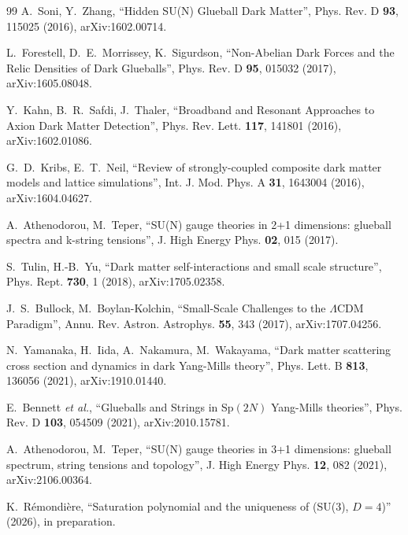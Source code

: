 \documentclass[aps,prd,twocolumn,nofootinbib,superscriptaddress,floatfix]{revtex4-2}
\begin{document}
\begin{thebibliography}{99}
 A.~Soni, Y.~Zhang, ``Hidden SU(N) Glueball Dark Matter'', Phys. Rev. D \textbf{93}, 115025 (2016), arXiv:1602.00714.

 L.~Forestell, D.~E.~Morrissey, K.~Sigurdson, ``Non-Abelian Dark Forces and the Relic Densities of Dark Glueballs'', Phys. Rev. D \textbf{95}, 015032 (2017), arXiv:1605.08048.

 Y.~Kahn, B.~R.~Safdi, J.~Thaler, ``Broadband and Resonant Approaches to Axion Dark Matter Detection'', Phys. Rev. Lett. \textbf{117}, 141801 (2016), arXiv:1602.01086.

 G.~D.~Kribs, E.~T.~Neil, ``Review of strongly-coupled composite dark matter models and lattice simulations'', Int. J. Mod. Phys. A \textbf{31}, 1643004 (2016), arXiv:1604.04627.

 A.~Athenodorou, M.~Teper, ``SU(N) gauge theories in 2+1 dimensions: glueball spectra and k-string tensions'', J. High Energy Phys. \textbf{02}, 015 (2017).

 S.~Tulin, H.-B.~Yu, ``Dark matter self-interactions and small scale structure'', Phys. Rept. \textbf{730}, 1 (2018), arXiv:1705.02358.

 J.~S.~Bullock, M.~Boylan-Kolchin, ``Small-Scale Challenges to the $\Lambda$CDM Paradigm'', Annu. Rev. Astron. Astrophys. \textbf{55}, 343 (2017), arXiv:1707.04256.

 N.~Yamanaka, H.~Iida, A.~Nakamura, M.~Wakayama, ``Dark matter scattering cross section and dynamics in dark Yang-Mills theory'', Phys. Lett. B \textbf{813}, 136056 (2021), arXiv:1910.01440.

 E.~Bennett \emph{et al.}, ``Glueballs and Strings in Sp$(2N)$ Yang-Mills theories'', Phys. Rev. D \textbf{103}, 054509 (2021), arXiv:2010.15781.

 A.~Athenodorou, M.~Teper, ``SU(N) gauge theories in 3+1 dimensions: glueball spectrum, string tensions and topology'', J. High Energy Phys. \textbf{12}, 082 (2021), arXiv:2106.00364.

 K.~R\'emondi\`ere, ``Saturation polynomial and the uniqueness of (SU(3), $D=4$)'' (2026), in preparation.

\end{thebibliography}
\end{document}
